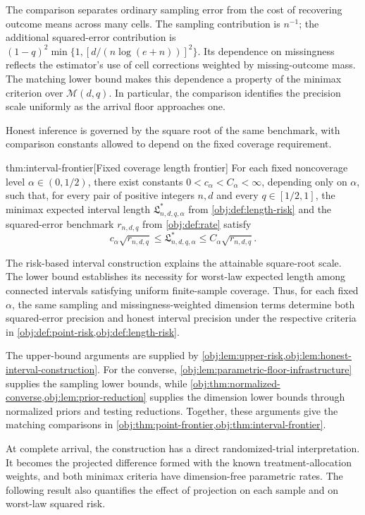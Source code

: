 \documentclass[11pt]{article}
\begin{document}
The comparison separates ordinary sampling error from the cost of recovering outcome means across many cells. The sampling contribution is \(n^{-1}\); the additional squared-error contribution is
\((1-q)^2\min\{1,[d/(n\log(e+n))]^2\}\).
Its dependence on missingness reflects the estimator's use of cell corrections weighted by missing-outcome mass. The matching lower bound makes this dependence a property of the minimax criterion over \(\mathcal M(d,q)\). In particular, the comparison identifies the precision scale uniformly as the arrival floor approaches one.

Honest inference is governed by the square root of the same benchmark, with comparison constants allowed to depend on the fixed coverage requirement.

\begin{theoremv}{thm:interval-frontier}[Fixed coverage length frontier]
For each fixed noncoverage level \(\alpha\in(0,1/2)\), there exist constants \(0<c_\alpha<C_\alpha<\infty\), depending only on \(\alpha\), such that, for every pair of positive integers \(n,d\) and every \(q\in[1/2,1]\), the minimax expected interval length \(\mathfrak L^*_{n,d,q,\alpha}\) from \cref{obj:def:length-risk} and the squared-error benchmark \(r_{n,d,q}\) from \cref{obj:def:rate} satisfy
\[
c_\alpha\sqrt{r_{n,d,q}}
\le \mathfrak L^*_{n,d,q,\alpha}
\le C_\alpha\sqrt{r_{n,d,q}}.
\]
\end{theoremv}

The risk-based interval construction explains the attainable square-root scale. The lower bound establishes its necessity for worst-law expected length among connected intervals satisfying uniform finite-sample coverage. Thus, for each fixed \(\alpha\), the same sampling and missingness-weighted dimension terms determine both squared-error precision and honest interval precision under the respective criteria in \cref{obj:def:point-risk,obj:def:length-risk}.

The upper-bound arguments are supplied by \cref{obj:lem:upper-risk,obj:lem:honest-interval-construction}. For the converse, \cref{obj:lem:parametric-floor-infrastructure} supplies the sampling lower bounds, while \cref{obj:thm:normalized-converse,obj:lem:prior-reduction} supplies the dimension lower bounds through normalized priors and testing reductions. Together, these arguments give the matching comparisons in \cref{obj:thm:point-frontier,obj:thm:interval-frontier}.

At complete arrival, the construction has a direct randomized-trial interpretation. It becomes the projected difference formed with the known treatment-allocation weights, and both minimax criteria have dimension-free parametric rates. The following result also quantifies the effect of projection on each sample and on worst-law squared risk.
\end{document}
